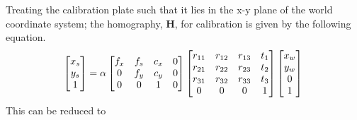 Treating the calibration plate such that it lies in the x-y plane of the world coordinate system; the homography, $\bm{H}$, for calibration is given by the following equation.
\begin{equation}
	\begin{bmatrix}
	x_s \\
	y_s \\
	1
	\end{bmatrix} = 
	\alpha
	\begin{bmatrix}
	f_x & f_s & c_x & 0\\
	0 & f_y & c_y & 0\\
	0 & 0 & 1 & 0
	\end{bmatrix}
	\begin{bmatrix}
	r_{11} & r_{12} & r_{13} & t_1 \\
	r_{21} & r_{22} & r_{23} & t_2 \\
	r_{31} & r_{32} & r_{33} & t_3 \\
	0 & 0 & 0 & 1
	\end{bmatrix}
	\begin{bmatrix}
	x_w \\
	y_w \\
	0 \\
	1
	\end{bmatrix} \\
\end{equation}
This can be reduced to 
